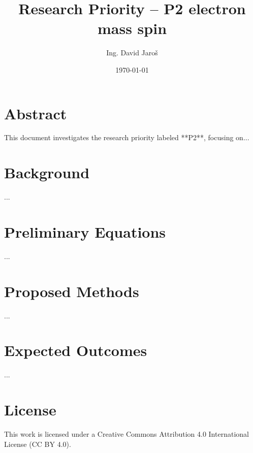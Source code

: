 \documentclass[12pt]{article}
\title{Research Priority – P2 electron mass spin}
\author{Ing. David Jaroš}
\date{\today}
\begin{document}
\maketitle

\section*{Abstract}
This document investigates the research priority labeled **P2**, focusing on...

\section*{Background}
...

\section*{Preliminary Equations}
...

\section*{Proposed Methods}
...

\section*{Expected Outcomes}
...


\section*{License}
This work is licensed under a Creative Commons Attribution 4.0 International License (CC BY 4.0).
\end{document}
